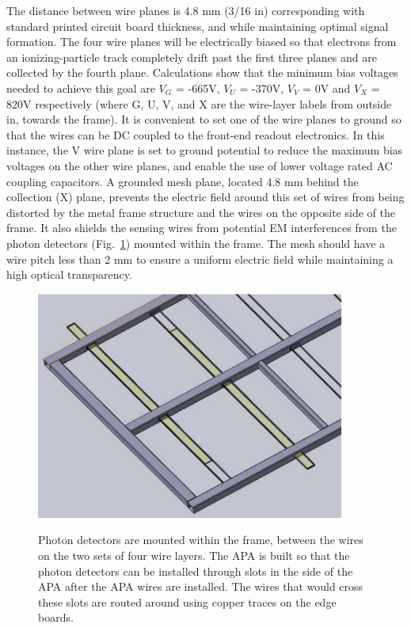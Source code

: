 The distance between wire planes is 4.8 mm (3/16 in) corresponding with standard printed circuit board thickness, and while maintaining optimal signal formation. The four wire planes will be electrically biased so that electrons from an ionizing-particle track completely drift past the first three planes and are collected by the fourth plane. Calculations show that the minimum bias voltages needed to achieve this goal are $V_G$ = -665V, $V_U$ = -370V, $V_V$ = 0V and $V_X$ = 820V respectively (where G, U, V, and X are the wire-layer labels from outside in, towards the frame).  It is convenient to set one of the wire planes to ground so that the wires can be DC coupled to the front-end readout electronics. In this instance, the V wire plane is set to ground potential to reduce the maximum bias voltages on the other wire planes, and enable the use of lower voltage rated AC coupling capacitors. A grounded mesh plane, located 4.8 mm behind the collection (X) plane, prevents the electric field around this set of wires from being distorted by the metal frame structure and the wires on the opposite side of the frame. It also shields the sensing wires from potential EM interferences from the photon detectors (Fig.~\ref{fig:tpc_apa_pd_insertion}) mounted within the frame. The mesh should have a wire pitch less than 2 mm to ensure a uniform electric field while maintaining a high optical transparency.

\begin{figure}[t]
  \centering
\includegraphics[width=4in]{figures/TPC_APA_3}
\label{fig:tpc_apa_pd_insertion}
  \caption{Photon detectors are mounted within the frame, between the wires on the two sets of four wire layers.  The APA is built so that the photon detectors can be installed through slots in the side of the APA after the APA wires are installed.  The wires that would cross these slots are routed around using copper traces on the edge boards.}
\end{figure}


